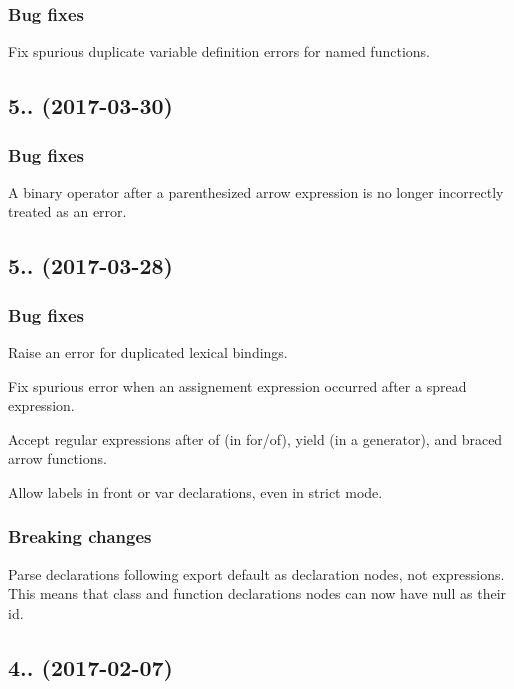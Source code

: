 \subsubsection*{Bug fixes}

Fix spurious duplicate variable definition errors for named functions.

\subsection*{5.. (2017-\/03-\/30)}

\subsubsection*{Bug fixes}

A binary operator after a parenthesized arrow expression is no longer incorrectly treated as an error.

\subsection*{5.. (2017-\/03-\/28)}

\subsubsection*{Bug fixes}

Raise an error for duplicated lexical bindings.

Fix spurious error when an assignement expression occurred after a spread expression.

Accept regular expressions after {\ttfamily of} (in {\ttfamily for}/{\ttfamily of}), {\ttfamily yield} (in a generator), and braced arrow functions.

Allow labels in front or {\ttfamily var} declarations, even in strict mode.

\subsubsection*{Breaking changes}

Parse declarations following {\ttfamily export default} as declaration nodes, not expressions. This means that class and function declarations nodes can now have {\ttfamily null} as their {\ttfamily id}.

\subsection*{4.. (2017-\/02-\/07)}

